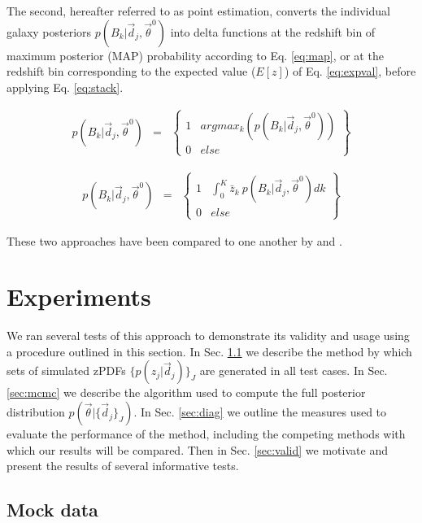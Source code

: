 \documentclass[preprint]{aastex}
\begin{document}
The second, hereafter referred to as point estimation, converts the individual 
galaxy posteriors $p(B_{k}|\vec{d}_{j},\vec{\theta}^{0})$ into delta functions 
at the redshift bin of maximum posterior (MAP) probability according to Eq. 
\ref{eq:map}, or at the redshift bin corresponding to the expected value 
($E[z]$) of Eq. \ref{eq:expval}, before applying Eq. \ref{eq:stack}.

\begin{eqnarray}
\label{eq:map}
p(B_{k}|\vec{d}_{j},\vec{\theta}^{0}) &=& 
\left\{\begin{array}{cc}1&argmax_{k}(p(B_{k}|\vec{d}_{j},\vec{\theta}^{0}))\\0&e
lse\end{array}\right\}
\end{eqnarray}

\begin{eqnarray}
\label{eq:expval}
p(B_{k}|\vec{d}_{j},\vec{\theta}^{0}) &=& 
\left\{\begin{array}{cc}1&\int_{0}^{K} \bar{z}_{k}\ 
p(B_{k}|\vec{d}_{j},\vec{\theta}^{0}) dk\\0&else\end{array}\right\}
\end{eqnarray}

These two approaches have been compared to one another by \citet{hil11} and 
\citet{ben12}.

\clearpage
\section{Experiments}
\label{sec:exp}

We ran several tests of this approach to demonstrate its validity and usage 
using a procedure outlined in this section.  In Sec. \ref{sec:mock} we describe 
the method by which sets of simulated zPDFs $\{p(z_{j}|\vec{d}_{j})\}_{J}$ are 
generated in all test cases.  In Sec. \ref{sec:mcmc} we describe the algorithm 
used to compute the full posterior distribution 
$p(\vec{\theta}|\{\vec{d}_{j}\}_{J})$.  In Sec. \ref{sec:diag} we outline the 
measures used to evaluate the performance of the method, including the 
competing methods with which our results will be compared.  Then in Sec. 
\ref{sec:valid} we motivate and present the results of several informative 
tests.

\clearpage
\subsection{Mock data}
\label{sec:mock}
\end{document}
